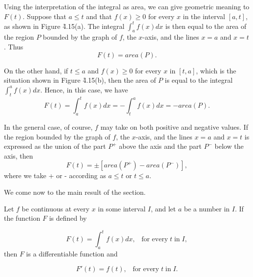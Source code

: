 Using the interpretation of the integral as area, we can give geometric meaning to $F(t)$. Suppose that $a \leq t$ and that $f(x) \geq 0$ for every $x$ in the interval $[a, t]$, as shown in Figure \f{4.15}(a). The integral $\int_{a}^{t} f(x) dx$ is then equal to the area of the region $P$ bounded by the graph of $f$, 
the $x$-axis, and the lines $x= a$ and $x= t$. Thus
$$
F(t) = area(P).
$$

On the other hand, if $t \leq a$ and $f(x) \geq 0$ for every $x$ in $[t, a]$, which is the situation shown in Figure \f{4.15}(b), then the area of $P$ is equal to the integral $\int_{t}^{a} f(x) dx$. Hence, in this case, we have  
$$
F(t) = \int_{a}^{t} f(x) dx = -\int_{t}^{a}  f(x) dx = -area(P).
$$


\noindent In the general case, of course, $f$ may take on both positive and negative values. If the region bounded by the graph of $f$, the $x$-axis, and the lines $x = a$ and $x = t$ is expressed as the union of the part $P^{+}$ above the axis and the part $P^{-}$ below the axis, then
$$
F (t) = \pm [area(P^{+}) - area(P^{-})],
$$
\noindent where we take + or - according as $a \leq t$ or $t \leq a$. 

We come now to the main result of the section.

\begin{prop}
\label{thm 4.5.2}
Let $f$ be continuous at every $x$ in some interval $I$, and let $a$ be a number in $I$. If the function $F$ is defined by

$$
F(t) = \int_{a}^{t} f(x) dx,\;\;\; \mbox{for every}\; t\; \mbox{in}\; I,
$$
\noindent then $F$ is a differentiable function and 

$$
F'(t) = f (t), \;\;\;\mbox{for every}\; t\; \mbox{in}\; I.
$$
\end{prop}

